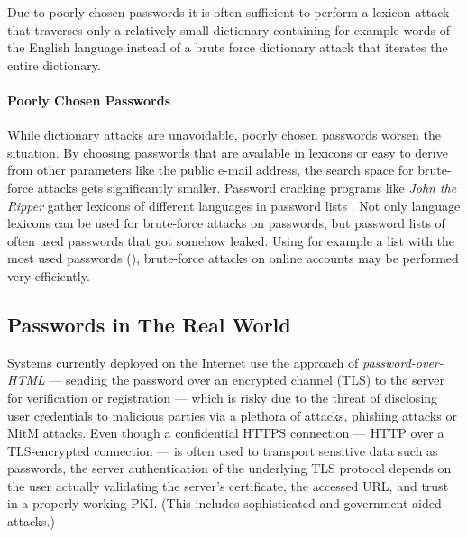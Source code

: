 Due to poorly chosen passwords it is often sufficient to perform a lexicon attack that traverses only a relatively small dictionary containing for example words of the English language instead of a brute force dictionary attack that iterates the entire dictionary.

\paragraph{Poorly Chosen Passwords}
While dictionary attacks are unavoidable, poorly chosen passwords worsen the situation.
By choosing passwords that are available in lexicons or easy to derive from other parameters like the public e-mail address, the search space for brute-force attacks gets significantly smaller.
Password cracking programs like \emph{John the Ripper} \cite{JohnTheRipper} gather lexicons of different languages in password lists \cite{JohnTheRipperWordlist}.
Not only language lexicons can be used for brute-force attacks on passwords, but password lists of often used passwords that got somehow leaked.
Using for example a list with the most used passwords (\eg \cite{XatoPwds}), brute-force attacks on online accounts may be performed very efficiently.


\subsection{Passwords in The Real World}
Systems currently deployed on the Internet use the approach of \emph{password-over-HTML} --- sending the password over an encrypted channel (TLS) to the server for verification or registration --- which is risky due to the threat of disclosing user credentials to malicious parties via a plethora of attacks, \eg phishing attacks or \ac{MitM} attacks.
Even though a confidential \ac{HTTPS} connection --- \ac{HTTP} over a \ac{TLS}-encrypted connection --- is often used to transport sensitive data such as passwords, the server authentication of the underlying \ac{TLS} protocol depends on the user actually validating the server's certificate, the accessed \ac{URL}, and trust in a properly working \ac{PKI}.
(This includes sophisticated and government aided attacks.)

